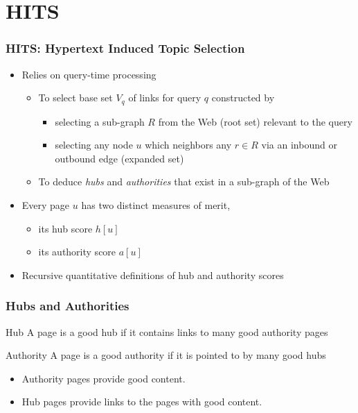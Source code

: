 \documentclass{beamer}
\begin{document}

\section{HITS}

\begin{frame}
  \frametitle{HITS: Hypertext Induced Topic Selection}

  \begin{itemize}
  \item Relies on query-time processing
    \begin{itemize}
    \item To select base set $V_q$ of links for query $q$ constructed by
      \begin{itemize}
      \item selecting a sub-graph $R$ from the Web (root set) relevant to the
        query
      \item selecting any node $u$ which neighbors any $r \in R$ via an inbound
        or outbound edge (expanded set)
      \end{itemize}
    \item To deduce \emph{hubs} and \emph{authorities} that exist in a
      sub-graph of the Web
    \end{itemize}
  \item Every page $u$ has two distinct measures of merit,
    \begin{itemize}
    \item its hub score $h[u]$
    \item its authority score $a[u]$
    \end{itemize}
  \item Recursive quantitative definitions of hub and authority scores
  \end{itemize}

\end{frame}


\begin{frame}
  \frametitle{Hubs and Authorities}

  \begin{block}{Hub}
    A page is a good hub if it contains links to many good authority pages
  \end{block}

  \begin{block}{Authority}
    A page is a good authority if it is pointed to by many good hubs
  \end{block}

  \begin{itemize}
  \item Authority pages provide good content.
  \item Hub pages provide links to the pages with good content.
  \end{itemize}

\end{frame}
\end{document}
